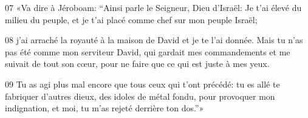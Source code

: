 
07 «Va dire à Jéroboam: “Ainsi parle le Seigneur, Dieu d’Israël: Je t’ai élevé du milieu du peuple, et je t’ai placé comme chef sur mon peuple Israël;

08 j’ai arraché la royauté à la maison de David et je te l’ai donnée. Mais tu n’as pas été comme mon serviteur David, qui gardait mes commandements et me suivait de tout son cœur, pour ne faire que ce qui est juste à mes yeux.

09 Tu as agi plus mal encore que tous ceux qui t’ont précédé: tu es allé te fabriquer d’autres dieux, des idoles de métal fondu, pour provoquer mon indignation, et moi, tu m’as rejeté derrière ton dos.”»
